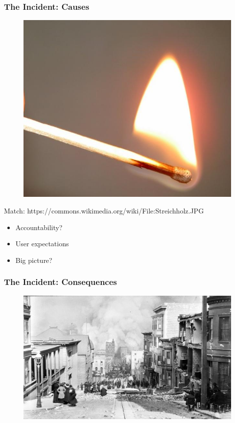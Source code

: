 \begin{frame}[fragile]
\frametitle{The Incident: Causes}

\begin{figure}
\includegraphics[scale=0.5]{match}
\end{figure}

\end{frame}

Match: https://commons.wikimedia.org/wiki/File:Streichholz.JPG

\begin{itemize}
\item Accountability?
\item User expectations
\item Big picture?
\end{itemize}

\begin{frame}[fragile]
\frametitle{The Incident: Consequences}

\begin{figure}
\includegraphics[scale=0.5]{fire}
\end{figure}

\end{frame}

